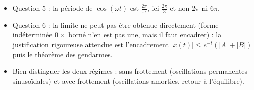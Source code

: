\documentclass[11pt]{article}
\begin{document}
\begin{corrige}
\begin{attention}
\begin{itemize}
\item Question 5 : la période de $\cos(\omega t)$ est $\frac{2\pi}{\omega}$, ici $\frac{2\pi}{3}$ et non $2\pi$ ni $6\pi$.
\item Question 6 : la limite ne peut pas être obtenue directement (forme indéterminée $0 \times$ borné n'en est pas une, mais il faut encadrer) : la justification rigoureuse attendue est l'encadrement $|x(t)| \leq e^{-t}(|A|+|B|)$ puis le théorème des gendarmes.
\item Bien distinguer les deux régimes : sans frottement (oscillations permanentes sinusoïdales) et avec frottement (oscillations amorties, retour à l'équilibre).
\end{itemize}
\end{attention}
\end{corrige}
\end{document}
